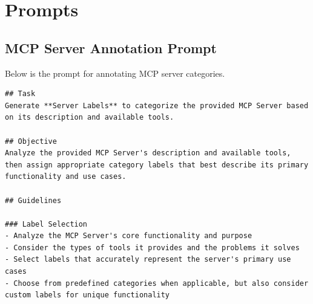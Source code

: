 \clearpage
\section{Prompts}
\label{app:prompts}

\subsection{MCP Server Annotation Prompt}
\label{app:server-category-annotation-prompt}

Below is the prompt for annotating MCP server categories.

\label{app:mcp-server-annotation-prompt}
\begin{verbatim}
## Task
Generate **Server Labels** to categorize the provided MCP Server based on its description and available tools.

## Objective
Analyze the provided MCP Server's description and available tools, then assign appropriate category labels that best describe its primary functionality and use cases.

## Guidelines

### Label Selection
- Analyze the MCP Server's core functionality and purpose
- Consider the types of tools it provides and the problems it solves
- Select labels that accurately represent the server's primary use cases
- Choose from predefined categories when applicable, but also consider custom labels for unique functionality


\end{verbatim}
